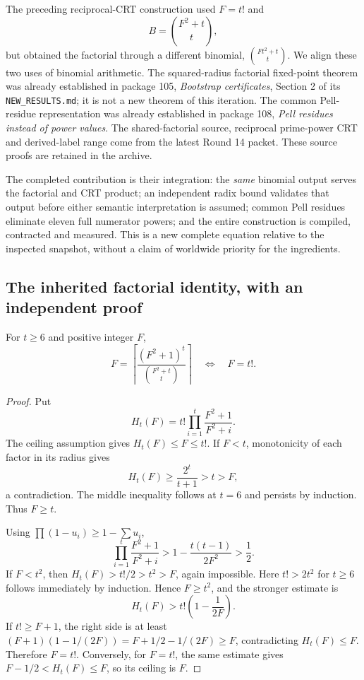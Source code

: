 The preceding reciprocal-CRT construction used $F=t!$ and
\[
 B=\binom{F^2+t}{t},
\]
but obtained the factorial through a different binomial,
$\binom{Ft^2+t}{t}$. We align these two uses of binomial arithmetic.
The squared-radius factorial fixed-point theorem was already established
in package 105, \emph{Bootstrap certificates}, Section 2 of its
\texttt{NEW\_RESULTS.md}; it is not a new theorem of this iteration.
The common Pell-residue representation was already established in package
108, \emph{Pell residues instead of power values}. The shared-factorial
source, reciprocal prime-power CRT and derived-label range come from the
latest Round 14 packet. These source proofs are retained in the archive.

The completed contribution is their integration: the \emph{same} binomial
output serves the factorial and CRT product; an independent radix bound
validates that output before either semantic interpretation is assumed;
common Pell residues eliminate eleven full numerator powers; and the
entire construction is compiled, contracted and measured. This is a new
complete equation relative to the inspected snapshot, without a claim of
worldwide priority for the ingredients.

\subsection{The inherited factorial identity, with an independent proof}

\begin{lemma}\label{lem:direct-factorial}
For $t\ge6$ and positive integer $F$,
\[
 F=\left\lceil\frac{(F^2+1)^t}{\binom{F^2+t}{t}}\right\rceil
       \quad\Longleftrightarrow\quad F=t!.
\]
\end{lemma}
\begin{proof}
Put
\[
 H_t(F)=t!\prod_{i=1}^{t}\frac{F^2+1}{F^2+i}.
\]
The ceiling assumption gives $H_t(F)\le F\le t!$. If $F<t$, monotonicity
of each factor in its radius gives
\[
 H_t(F)\ge\frac{2^t}{t+1}>t>F,
\]
a contradiction. The middle inequality follows at $t=6$ and persists
by induction. Thus $F\ge t$.

Using $\prod(1-u_i)\ge1-\sum u_i$,
\[
 \prod_{i=1}^{t}\frac{F^2+1}{F^2+i}
 >1-\frac{t(t-1)}{2F^2}>\frac12.
\]
If $F<t^2$, then $H_t(F)>t!/2>t^2>F$, again impossible. Here
$t!>2t^2$ for $t\ge6$ follows immediately by induction. Hence $F\ge t^2$,
and the stronger estimate is
\[
 H_t(F)>t!\left(1-\frac1{2F}\right).
\]
If $t!\ge F+1$, the right side is at least
$(F+1)(1-1/(2F))=F+1/2-1/(2F)\ge F$, contradicting $H_t(F)\le F$.
Therefore $F=t!$. Conversely, for $F=t!$, the same estimate gives
$F-1/2<H_t(F)\le F$, so its ceiling is $F$.
\end{proof}

